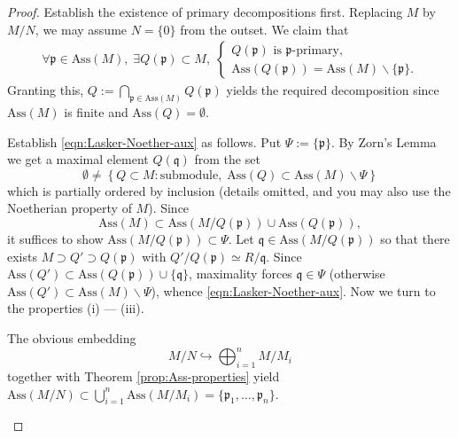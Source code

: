 \begin{proof}
	Establish the existence of primary decompositions first. Replacing $M$ by $M/N$, we may assume $N = \{0\}$ from the outset. We claim that
	\begin{gather}\label{eqn:Lasker-Noether-aux}
		\forall \mathfrak{p} \in \text{Ass}(M), \; \exists Q(\mathfrak{p}) \subset M, \;
		\left\{ \begin{array}{l}
			Q(\mathfrak{p}) \text{ is } \mathfrak{p}\text{-primary}, \\
			\text{Ass}(Q(\mathfrak{p})) = \text{Ass}(M) \smallsetminus \{ \mathfrak{p} \}. 
		\end{array}\right.
	\end{gather}
	Granting this, $Q := \bigcap_{\mathfrak{p} \in \text{Ass}(M)} Q(\mathfrak{p})$ yields the required decomposition since $\text{Ass}(M)$ is finite and $\text{Ass}(Q) = \emptyset$.
	
	Establish \eqref{eqn:Lasker-Noether-aux} as follows. Put $\Psi := \{ \mathfrak{p} \}$. By Zorn's Lemma we get a maximal element $Q(\mathfrak{q})$ from the set
	\[ \emptyset \neq \left\{  Q \subset M: \text{submodule}, \; \text{Ass}(Q) \subset \text{Ass}(M) \smallsetminus \Psi \right\} \]
	which is partially ordered by inclusion (details omitted, and you may also use the Noetherian property of $M$). Since
	\[ \text{Ass}(M) \subset \text{Ass}(M/Q(\mathfrak{p})) \cup \text{Ass}(Q(\mathfrak{p})), \]
	it suffices to show $\text{Ass}(M/Q(\mathfrak{p})) \subset \Psi$.  Let $\mathfrak{q} \in \text{Ass}(M/Q(\mathfrak{p}))$ so that there exists $M \supset Q' \supset Q(\mathfrak{p})$ with $Q'/Q(\mathfrak{p}) \simeq R/\mathfrak{q}$. Since $\text{Ass}(Q') \subset \text{Ass}(Q(\mathfrak{p})) \cup \{ \mathfrak{q} \}$, maximality forces $\mathfrak{q} \in \Psi$ (otherwise $\text{Ass}(Q') \subset \text{Ass}(M) \smallsetminus \Psi$), whence \eqref{eqn:Lasker-Noether-aux}. Now we turn to the properties (i) --- (iii).
	
	\begin{asparaenum}[(i)]
		\item The obvious embedding
		\[ M/N \hookrightarrow \bigoplus_{i=1}^n M/M_i \]
		together with Theorem \ref{prop:Ass-properties} yield $\text{Ass}(M/N) \subset \bigcup_{i=1}^n \text{Ass}(M/M_i) = \{ \mathfrak{p}_1, \ldots, \mathfrak{p}_n \}$.
		

\end{asparaenum}
\end{proof}
